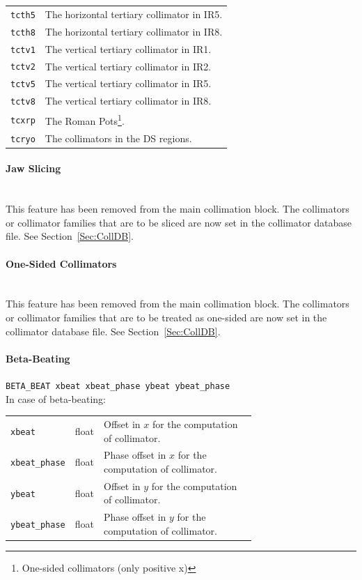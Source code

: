 \begin{longtabu}{@{}ll}
    \texttt{tcth5}   & The horizontal tertiary collimator in IR5. \\
    \texttt{tcth8}   & The horizontal tertiary collimator in IR8. \\
    \texttt{tctv1}   & The vertical tertiary collimator in IR1. \\
    \texttt{tctv2}   & The vertical tertiary collimator in IR2. \\
    \texttt{tctv5}   & The vertical tertiary collimator in IR5. \\
    \texttt{tctv8}   & The vertical tertiary collimator in IR8. \\
    \texttt{tcxrp}   & The Roman Pots\footnote{One-sided collimators (only positive x)}. \\
    \texttt{tcryo}   & The collimators in the DS regions.
\end{longtabu}

\paragraph{Jaw Slicing}~\\

This feature has been removed from the main collimation block.
The collimators or collimator families that are to be sliced are now set in the collimator database file.
See Section~\ref{Sec:CollDB}.

\paragraph{One-Sided Collimators}~\\

This feature has been removed from the main collimation block.
The collimators or collimator families that are to be treated as one-sided are now set in the collimator database file.
See Section~\ref{Sec:CollDB}.

\paragraph{Beta-Beating} \texttt{BETA\_BEAT xbeat xbeat\_phase ybeat ybeat\_phase}\\

In case of beta-beating:

\bigskip
\begin{tabular}{@{}llp{0.7\linewidth}}
    \texttt{xbeat}        & float & Offset in $x$ for the computation of collimator. \\
    \texttt{xbeat\_phase} & float & Phase offset in $x$ for the computation of collimator. \\
    \texttt{ybeat}        & float & Offset in $y$ for the computation of collimator. \\
    \texttt{ybeat\_phase} & float & Phase offset in $y$ for the computation of collimator.
\end{tabular}

